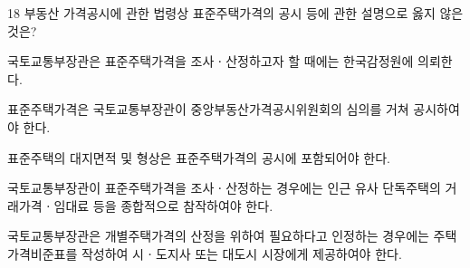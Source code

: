 \begin{question}{18}
부동산 가격공시에 관한 법령상 표준주택가격의 공시 등에 관한 설명으로 옳지 않은 것은?
\begin{choices}
  \item 국토교통부장관은 표준주택가격을 조사ㆍ산정하고자 할 때에는 한국감정원에 의뢰한다.
  \item 표준주택가격은 국토교통부장관이 중앙부동산가격공시위원회의 심의를 거쳐 공시하여야 한다.
  \item 표준주택의 대지면적 및 형상은 표준주택가격의 공시에 포함되어야 한다.
  \item 국토교통부장관이 표준주택가격을 조사ㆍ산정하는 경우에는 인근 유사 단독주택의 거래가격ㆍ임대료 등을 종합적으로 참작하여야 한다.
  \item 국토교통부장관은 개별주택가격의 산정을 위하여 필요하다고 인정하는 경우에는 주택가격비준표를 작성하여 시ㆍ도지사 또는 대도시 시장에게 제공하여야 한다.
\end{choices}
\end{question}
